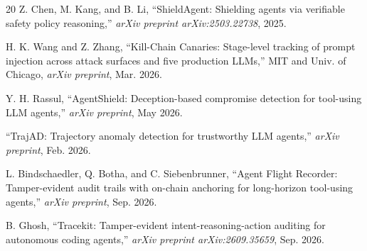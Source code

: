 \documentclass[conference]{IEEEtran}
\begin{document}
\begin{thebibliography}{20}
Z. Chen, M. Kang, and B. Li, ``ShieldAgent: Shielding agents via verifiable safety policy reasoning,'' \emph{arXiv preprint arXiv:2503.22738}, 2025.

H. K. Wang and Z. Zhang, ``Kill-Chain Canaries: Stage-level tracking of prompt injection across attack surfaces and five production LLMs,'' MIT and Univ. of Chicago, \emph{arXiv preprint}, Mar. 2026.

Y. H. Rassul, ``AgentShield: Deception-based compromise detection for tool-using LLM agents,'' \emph{arXiv preprint}, May 2026.

``TrajAD: Trajectory anomaly detection for trustworthy LLM agents,'' \emph{arXiv preprint}, Feb. 2026.

L. Bindschaedler, Q. Botha, and C. Siebenbrunner, ``Agent Flight Recorder: Tamper-evident audit trails with on-chain anchoring for long-horizon tool-using agents,'' \emph{arXiv preprint}, Sep. 2026.

B. Ghosh, ``Tracekit: Tamper-evident intent-reasoning-action auditing for autonomous coding agents,'' \emph{arXiv preprint arXiv:2609.35659}, Sep. 2026.

\end{thebibliography}
\end{document}
